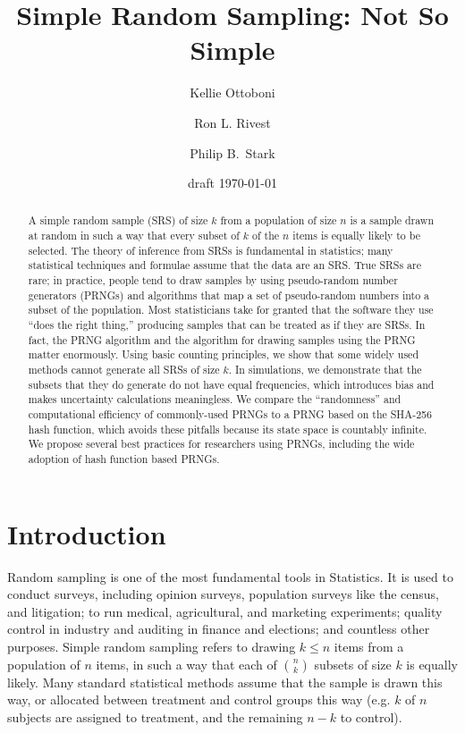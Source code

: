 \documentclass[12pt]{article}
\begin{document}
\title{Simple Random Sampling: Not So Simple}
\author{Kellie Ottoboni
\and
Ron L. Rivest
\and
Philip B.~Stark 
}

\date{draft \today}




\maketitle

\begin{abstract}
\small
A simple random sample (SRS) of size $k$ from a population of size $n$ is a sample drawn 
at random in such a way that every subset of $k$ of the $n$ items is equally likely to be selected. 
The theory of inference from SRSs is fundamental in statistics;
many statistical techniques and formulae assume that the data are an SRS.
True SRSs are rare; in practice, people tend to draw samples by using pseudo-random number generators 
(PRNGs) and algorithms that map a set of pseudo-random numbers into a subset of the population. 
Most statisticians take for granted that the software they use ``does the right thing,''
producing samples that can be treated as if they are SRSs.
In fact, the PRNG algorithm and the algorithm for drawing samples using the PRNG matter
enormously.
Using basic counting principles, we show that some widely used methods cannot generate all SRSs of size $k$.
In simulations, we demonstrate that the subsets that they do generate do not have equal frequencies, which
introduces bias and makes uncertainty calculations meaningless.
We compare the ``randomness'' and computational efficiency of commonly-used PRNGs to a PRNG 
based on the SHA-256 hash function, which avoids these pitfalls because its state space is countably infinite.
We propose several best practices for researchers using PRNGs, including the wide adoption of hash function based PRNGs.
\end{abstract}


\newpage
\tableofcontents
\newpage 

\section{Introduction}
Random sampling is one of the most fundamental tools in Statistics.
It is used to conduct surveys, including opinion surveys, population surveys like the census, and litigation; 
to run medical, agricultural, and marketing experiments; 
quality control in industry and auditing in finance and elections;
and countless other purposes.
Simple random sampling refers to drawing $k \leq n$ items from a population of $n$ items,
in such a way that each of ${n \choose k}$ subsets of size $k$ is equally likely.
Many standard statistical methods assume that the sample is drawn this way, 
or allocated between treatment and control groups this way
(e.g. $k$ of $n$ subjects are assigned to treatment, and the remaining $n-k$ to control).
\end{document}
